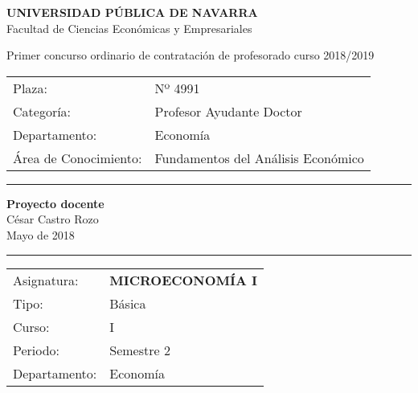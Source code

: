 \documentclass{article}\usepackage[]{graphicx}\usepackage[]{color}
\begin{document}
\begin{center}
\textbf{UNIVERSIDAD PÚBLICA DE NAVARRA}\\
Facultad de Ciencias Económicas y Empresariales
\vspace{10pt}

Primer concurso ordinario de contratación de profesorado curso 2018/2019\\
\begin{tabular}{l l}
Plaza:  &Nº 4991\\
Categoría: &Profesor Ayudante Doctor\\
Departamento: &Economía\\
Área de Conocimiento: &Fundamentos del Análisis Económico\\
\end{tabular}

\textcolor[RGB]{85,87,89}{\rule{\linewidth}{0.4pt}}

\vspace{5pt}

\textbf{Proyecto docente}\\
César Castro Rozo\\
Mayo de 2018\\
\vspace{5pt}

\textcolor[RGB]{85,87,89}{\rule{\linewidth}{0.4pt}}

\begin{tabular}{l l}
Asignatura: &\textbf{MICROECONOMÍA I}\\
Tipo: &Básica\\
Curso: &I\\
Periodo: &Semestre 2\\
Departamento: &Economía
\end{tabular}
\end{center}
\vspace{5pt}
\end{document}
